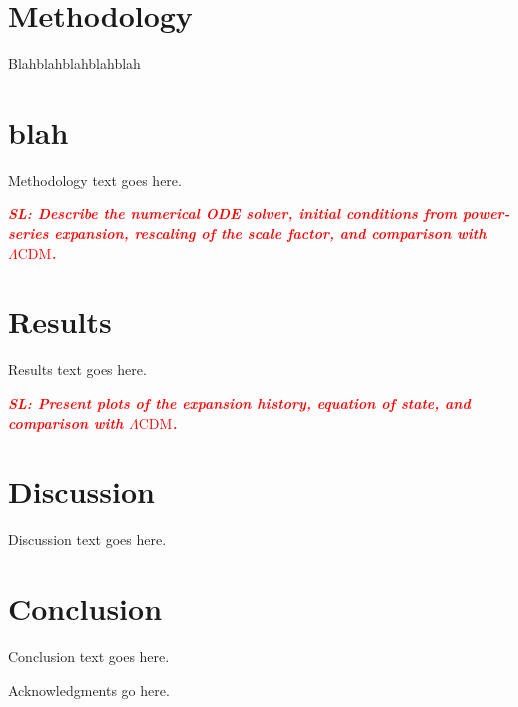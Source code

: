 \documentclass[aps,prd,reprint,preprintnumbers,showpacs,floatfix,nofootinbib,superscriptaddress]{revtex4-2}
\newcommand{\LCDM}{\ensuremath{\Lambda\mathrm{CDM}}}
\newcommand{\SL}[1]{\textbf{\textit{\textcolor{red}{SL: #1}}}}
\begin{document}
\section{Methodology}\label{sec:methodology}

Blahblahblahblahblah

\section{blah}

Methodology text goes here.

\SL{Describe the numerical ODE solver, initial conditions from power-series expansion, rescaling of the scale factor, and comparison with \LCDM{}.}

\section{Results}\label{sec:results}

Results text goes here.

\SL{Present plots of the expansion history, equation of state, and comparison with \LCDM{}.}

\section{Discussion}\label{sec:discussion}

Discussion text goes here.

\section{Conclusion}\label{sec:conclusion}

Conclusion text goes here.

\begin{acknowledgments}
Acknowledgments go here.
\end{acknowledgments}



\end{document}
